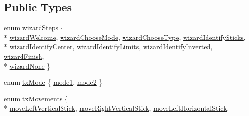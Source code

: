 \subsection*{Public Types}
\begin{DoxyCompactItemize}
\item 
enum \hyperlink{group___config_plugin_gaff6f51e26da0007601686dea42662026}{wizard\-Steps} \{ \\*
\hyperlink{group___config_plugin_ggaff6f51e26da0007601686dea42662026af166a34b95fbdaae06e16dae0bee21a6}{wizard\-Welcome}, 
\hyperlink{group___config_plugin_ggaff6f51e26da0007601686dea42662026a310370c2ef85c9777b074d73e5bb5884}{wizard\-Choose\-Mode}, 
\hyperlink{group___config_plugin_ggaff6f51e26da0007601686dea42662026ae775c0fe70455ac0a9591270dccfe781}{wizard\-Choose\-Type}, 
\hyperlink{group___config_plugin_ggaff6f51e26da0007601686dea42662026a993ee72c5d5dfec2fbbc57227cf88b73}{wizard\-Identify\-Sticks}, 
\\*
\hyperlink{group___config_plugin_ggaff6f51e26da0007601686dea42662026a1f79211c52d3bb2811537556447be618}{wizard\-Identify\-Center}, 
\hyperlink{group___config_plugin_ggaff6f51e26da0007601686dea42662026af08e7c72e59fa3307dadc24fe44c60a9}{wizard\-Identify\-Limits}, 
\hyperlink{group___config_plugin_ggaff6f51e26da0007601686dea42662026adf2d2149946d1071b2c023debc166182}{wizard\-Identify\-Inverted}, 
\hyperlink{group___config_plugin_ggaff6f51e26da0007601686dea42662026a05c6d240437bb431db8eab662f682479}{wizard\-Finish}, 
\\*
\hyperlink{group___config_plugin_ggaff6f51e26da0007601686dea42662026aaaa99fe9278c167cddeef5610d52ea7a}{wizard\-None}
 \}
\item 
enum \hyperlink{group___config_plugin_ga31df78b288ede0bb05f55e72b6c12d25}{tx\-Mode} \{ \hyperlink{group___config_plugin_gga31df78b288ede0bb05f55e72b6c12d25a9261205ca870346721ee8afbbcabab2f}{mode1}, 
\hyperlink{group___config_plugin_gga31df78b288ede0bb05f55e72b6c12d25abae2cbce71390fa9fd177fe78814c8ec}{mode2}
 \}
\item 
enum \hyperlink{group___config_plugin_ga71db16a79c805267a16c0c9e5279c771}{tx\-Movements} \{ \\*
\hyperlink{group___config_plugin_gga71db16a79c805267a16c0c9e5279c771af167653d9de36560bf58e47e6b240b07}{move\-Left\-Vertical\-Stick}, 
\hyperlink{group___config_plugin_gga71db16a79c805267a16c0c9e5279c771a210add414057e08bdf85133e4d5ec071}{move\-Right\-Vertical\-Stick}, 
\hyperlink{group___config_plugin_gga71db16a79c805267a16c0c9e5279c771abab68a816962f9b2243635de7c9ade8e}{move\-Left\-Horizontal\-Stick}, 

\end{DoxyCompactItemize}
